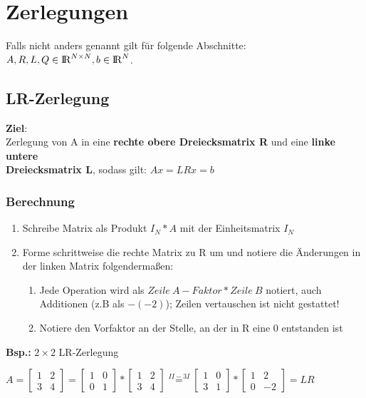 \documentclass[10pt,a4paper]{article}
\def\realnumbers{{\rm I\!R}}
\newcommand{\rom}[1]{\uppercase\expandafter{\romannumeral #1\relax}}
\begin{document}
	\newpage
	\section{Zerlegungen}
	Falls nicht anders genannt gilt für folgende Abschnitte: $A, R, L, Q \in \realnumbers^{N \times N}, b \in \realnumbers^N$.

	\subsection{LR-Zerlegung}
	\textbf{Ziel}:\\Zerlegung von A in eine \textbf{rechte obere Dreiecksmatrix R} und eine \textbf{linke untere\\Dreiecksmatrix L}, sodass gilt: $Ax = LRx = b$
	\subsubsection{Berechnung}
	\begin{enumerate}
		\item Schreibe Matrix als Produkt $I_N * A$ mit der Einheitsmatrix $I_N$
		\item Forme schrittweise die rechte Matrix zu R um und notiere die Änderungen in der linken Matrix folgendermaßen:
		\begin{enumerate}
			\item Jede Operation wird als $Zeile\ A - Faktor * Zeile\ B$ notiert, auch\\
			Additionen (z.B als \rom{2}$ - (-2)$\rom{1}); Zeilen vertauschen ist nicht gestattet!
			\item Notiere den Vorfaktor an der Stelle, an der in R eine 0 entstanden ist
		\end{enumerate}
	\end{enumerate}
	\textbf{Bsp.:} $2\times2$ LR-Zerlegung
	\begin{center}
		$A = 
		\begin{bmatrix}1 & 2 \\ 3 & 4\end{bmatrix} =
		\begin{bmatrix}1 & 0 \\ 0 & 1\end{bmatrix} * \begin{bmatrix}1 & 2 \\ 3 & 4\end{bmatrix} \stackrel{II - 3I}{=}
		\begin{bmatrix}1 & 0 \\ 3 & 1\end{bmatrix} * \begin{bmatrix}1 & 2 \\ 0 & -2\end{bmatrix} = LR
		$	
	\end{center}
\end{document}
